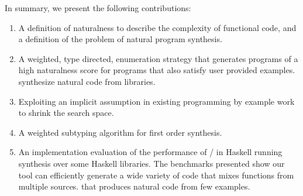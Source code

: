 In summary, we present the following contributions:

\begin{enumerate}
\item A definition of naturalness to describe the complexity of functional code, and a definition of the problem of natural program synthesis.
\item A weighted, type directed, enumeration strategy that generates programs of a high naturalness score for programs that also satisfy user provided examples. synthesize natural code from libraries.
\item Exploiting an implicit assumption in existing programming by example work to shrink the search space.
\item A weighted subtyping algorithm for first order synthesis.
\item An implementation evaluation of the performance of \ourTool/ in Haskell running synthesis over some Haskell libraries. The benchmarks presented show our tool can efficiently generate a wide variety of code that mixes functions from multiple sources. that produces natural code from few examples.
\end{enumerate}
